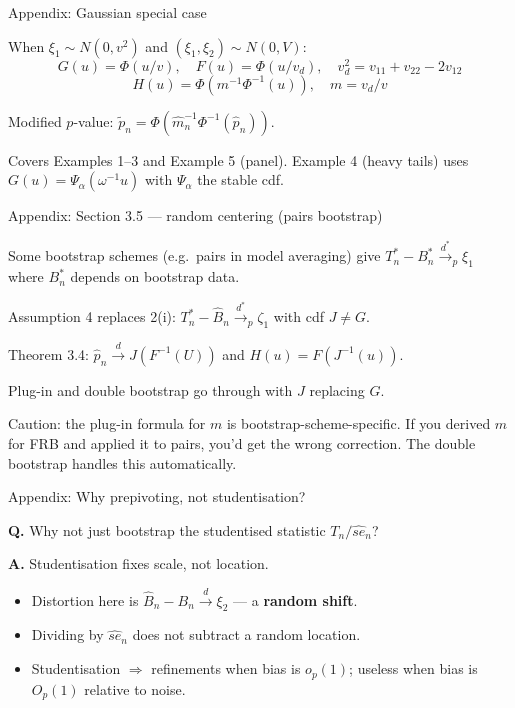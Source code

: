 \documentclass[10pt,aspectratio=169]{beamer}
\theoremstyle{plain}
\newcommand{\dto}{\xrightarrow{d}}
\newcommand{\dstarto}{\xrightarrow{d^{*}}}
\newcommand{\Tns}{T_{n}^{*}}
\newcommand{\Bnh}{\hat{B}_{n}}
\newcommand{\pnh}{\hat{p}_{n}}
\newcommand{\pnt}{\tilde{p}_{n}}
\begin{document}
\begin{frame}[noframenumbering]{Appendix: Gaussian special case}

  When $\xi_1 \sim N(0,v^2)$ and $(\xi_1,\xi_2) \sim N(0,V)$:
  \[
    G(u) = \Phi(u/v), \quad F(u) = \Phi(u/v_d),
    \quad v_d^2 = v_{11} + v_{22} - 2v_{12}
  \]
  \[
    H(u) = \Phi(m^{-1}\Phi^{-1}(u)), \quad m = v_d/v
  \]

  Modified $p$-value: $\pnt = \Phi(\hat{m}_n^{-1}\Phi^{-1}(\pnh))$.

  \medskip

  \footnotesize
  Covers Examples 1--3 and Example 5 (panel). Example 4 (heavy tails)
  uses $G(u) = \Psi_\alpha(\omega^{-1}u)$ with $\Psi_\alpha$ the stable cdf.

\end{frame}

\begin{frame}[noframenumbering]{Appendix: Section 3.5 --- random centering (pairs bootstrap)}

  Some bootstrap schemes (e.g.\ pairs in model averaging) give
  $\Tns - B_n^* \dstarto_p \xi_1$ where $B_n^*$ depends on bootstrap data.

  \medskip

  Assumption 4 replaces 2(i): $\Tns - \Bnh \dstarto_p \zeta_1$ with cdf $J \neq G$.

  \medskip

  Theorem 3.4: $\pnh \dto J(F^{-1}(U))$ and $H(u) = F(J^{-1}(u))$.

  \medskip

  Plug-in and double bootstrap go through with $J$ replacing $G$.

  \bigskip

  \alert{Caution:} the plug-in formula for $m$ is bootstrap-scheme-specific.
  If you derived $m$ for FRB and applied it to pairs, you'd get the wrong correction.
  The double bootstrap handles this automatically.

\end{frame}

\begin{frame}[noframenumbering]{Appendix: Why prepivoting, not studentisation?}

  \textbf{Q.} Why not just bootstrap the studentised statistic $T_n / \hat{se}_n$?

  \medskip

  \textbf{A.} Studentisation fixes \alert{scale}, not \alert{location}.

  \medskip

  \begin{itemize}
    \setlength{\itemsep}{6pt}
    \item Distortion here is $\hat B_n - B_n \dto \xi_2$ --- a \textbf{random shift}.
    \item Dividing by $\hat{se}_n$ does not subtract a random location.
    \item Studentisation $\Rightarrow$ refinements when bias is $o_p(1)$;
      useless when bias is $O_p(1)$ relative to noise.
  \end{itemize}

\end{frame}
\end{document}
